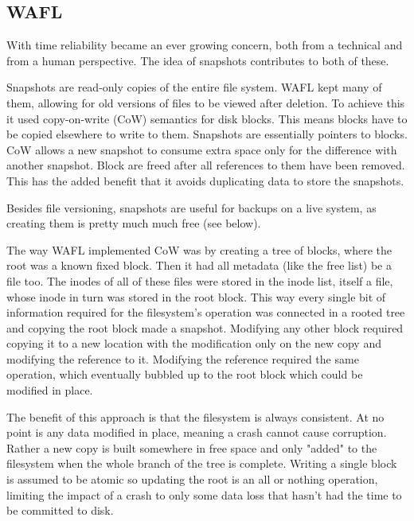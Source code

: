         \subsection{WAFL}
            \label{sec:WAFL}

            With time reliability became an ever growing concern, both from a
            technical and from a human perspective. The idea of snapshots
            contributes to both of these.

            Snapshots are read-only copies of the entire file system. WAFL
            \cite{WAFL} kept many of them, allowing for old versions of files
            to be viewed after deletion. To achieve this it used copy-on-write
            (CoW) semantics for disk blocks. This means blocks have to be
            copied elsewhere to write to them. Snapshots are essentially
            pointers to blocks. CoW allows a new snapshot to consume extra
            space only for the difference with another snapshot. Block are
            freed after all references to them have been removed. This has
            the added benefit that it avoids duplicating data to store the
            snapshots.

            Besides file versioning, snapshots are useful for backups on a live
            system, as creating them is pretty much much free (see below).

            The way WAFL implemented CoW was by creating a tree of blocks,
            where the root was a known fixed block. Then it had all metadata
            (like the free list) be a file too. The inodes of all of these
            files were stored in the inode list, itself a file, whose inode
            in turn was stored in the root block. This way every single bit of
            information required for the filesystem's operation was connected in
            a rooted tree and copying the root block made a snapshot.
            Modifying any other block required copying it to a new location
            with the modification only on the new copy and modifying the
            reference to it. Modifying the reference required the same
            operation, which eventually bubbled up to the root block which could
            be modified in place.

            The benefit of this approach is that the filesystem is always
            consistent. At no point is any data modified in place, meaning a
            crash cannot cause corruption. Rather a new copy is built somewhere
            in free space and only "added" to the filesystem when the whole
            branch of the tree is complete. Writing a single block is assumed
            to be atomic \cite{drive_atomicity} so updating the root is an all
            or nothing operation, limiting the impact of a crash to only some
            data loss that hasn't had the time to be committed to disk.

